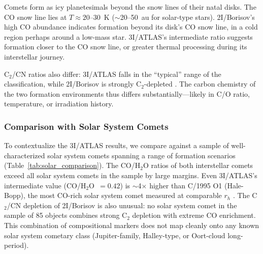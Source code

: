 \documentclass[preprint2]{aastex631}
\begin{document}
Comets form as icy planetesimals beyond the snow lines of their natal disks. The CO snow line lies at $T \approx 20$--30~K ($\sim$20--50~au for solar-type stars). 2I/Borisov's high CO abundance indicates formation beyond its disk's CO snow line, in a cold region perhaps around a low-mass star. 3I/ATLAS's intermediate ratio suggests formation closer to the CO snow line, or greater thermal processing during its interstellar journey.

C$_2$/CN ratios also differ: 3I/ATLAS falls in the ``typical'' range of the \citet{ahearn95} classification, while 2I/Borisov is strongly C$_2$-depleted \citep{opitom20}. The carbon chemistry of the two formation environments thus differs substantially---likely in C/O ratio, temperature, or irradiation history.

\subsubsection{Comparison with Solar System Comets}

To contextualize the 3I/ATLAS results, we compare against a sample of well-characterized solar system comets spanning a range of formation scenarios (Table~\ref{tab:solar_comparison}). The CO/H$_2$O ratios of both interstellar comets exceed all solar system comets in the sample by large margins. Even 3I/ATLAS's intermediate value (CO/H$_2$O~$=0.42$) is $\sim$4$\times$ higher than C/1995 O1 (Hale-Bopp), the most CO-rich solar system comet measured at comparable $r_h$ \citep{bockelee04}. The C$_2$/CN depletion of 2I/Borisov is also unusual: no solar system comet in the \citet{ahearn95} sample of 85 objects combines strong C$_2$ depletion with extreme CO enrichment. This combination of compositional markers does not map cleanly onto any known solar system cometary class (Jupiter-family, Halley-type, or Oort-cloud long-period).
\end{document}
